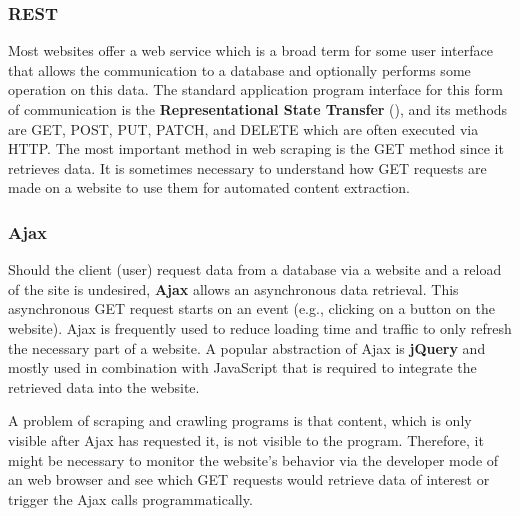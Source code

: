 \subsubsection{REST}
  Most websites offer a web service which is a broad term for some user interface that allows the communication to a database and optionally performs some operation on this data.
  The standard application program interface for this form of communication is the \textbf{Representational State Transfer} (), and its methods are GET, POST, PUT, PATCH, and DELETE which are often executed via HTTP.
  The most important method in web scraping is the GET method since it retrieves data.
  It is sometimes necessary to understand how GET requests are made on a website to use them for automated content extraction.

\subsubsection{Ajax}
  Should the client (user) request data from a database via a website and a reload of the site is undesired, \textbf{Ajax} allows an asynchronous data retrieval.
  This asynchronous GET request starts on an event (e.g., clicking on a button on the website).
  Ajax is frequently used to reduce loading time and traffic to only refresh the necessary part of a website.
  A popular abstraction of Ajax is \textbf{jQuery} and mostly used in combination with JavaScript that is required to integrate the retrieved data into the website.

  A problem of scraping and crawling programs is that content, which is only visible after Ajax has requested it, is not visible to the program.
  Therefore, it might be necessary to monitor the website's behavior via the developer mode of an web browser and see which GET requests would retrieve data of interest or trigger the Ajax calls programmatically.
